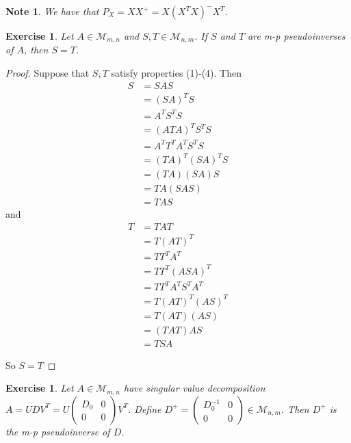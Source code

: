 \documentclass[12pt]{amsart}
\newtheorem{note}[thm]{Note}
\newtheorem{ex}[thm]{Exercise}
\newcommand{\MM}{\mathcal{M}}
\begin{document}
\begin{note}
We have that $P_X = XX^+ = X(X^TX)^-X^T$. 
\end{note}

\begin{ex}
Let $A \in \MM_{m,n}$ and $S,T \in \MM_{n,m}$. If $S$ and $T$ are m-p pseudoinverses of $A$, then $S=T$. 
\end{ex}

\begin{proof}
Suppose that $S,T$ satisfy properties (1)-(4). Then 
\begin{align*}
S
&= SAS \\
&= (SA)^TS \\
&= A^TS^TS \\
&= (ATA)^TS^TS \\
&= A^TT^TA^TS^TS \\
&= (TA)^T(SA)^TS \\
&= (TA)(SA)S \\
&= TA(SAS) \\
&= TAS
\end{align*}
and 
\begin{align*}
T 
&= TAT \\
&= T(AT)^T \\
&= TT^TA^T \\
&= TT^T(ASA)^T \\
&= TT^TA^TS^TA^T \\
&= T(AT)^T (AS)^T \\
&= T(AT) (AS) \\
&= (TAT)AS \\
&= TSA 
\end{align*} 

So $S=T$
\end{proof}

\begin{ex}
Let $A \in \MM_{m, n}$ have singular value decomposition $A = UDV^T = U
\begin{pmatrix}
D_0 & 0 \\
0 & 0
\end{pmatrix}
V^T$. Define $D^+ = \begin{pmatrix}
D_0^{-1} & 0 \\
0 & 0
\end{pmatrix} \in \MM_{n,m}$. Then $D^+$ is the m-p pseudoinverse of $D$.
\end{ex}
\end{document}
